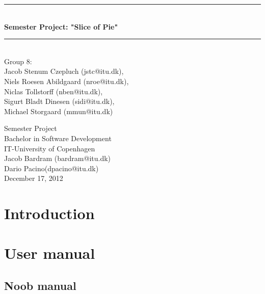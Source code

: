 \documentclass[a4paper,11pt]{article}
\begin{document}
\begin{titlepage}
\centering \parindent=0pt
\newcommand{\HRule}{\rule{\textwidth}{1mm}}
 \HRule\\[1cm]\Huge\bfseries
Semester Project: "Slice of Pie"\\[0.7cm]
\HRule\\[4cm]  \large Group 8:
\\Jacob Stenum Czepluch (jstc@itu.dk), \\Niels Roesen Abildgaard (nroe@itu.dk), \\Niclas Tollstorff (nben@itu.dk), \\Sigurt Bladt Dinesen (sidi@itu.dk), \\Michael Storgaard (mmun@itu.dk)\\
 \normalsize %
\begin{flushleft}
Semester Project\\
Bachelor in Software Development\\
IT-University of Copenhagen\\
Jacob Bardram (bardram@itu.dk)\\
Dario Pacino(dpacino@itu.dk) \\
December 17, 2012 \end{flushleft}
\end{titlepage}

\tableofcontents
\pagebreak

\pagebreak
\section{Introduction}


\pagebreak
\section{User manual}


\pagebreak
\subsection{Noob manual}
\label{sec:User manual}

\end{document}
